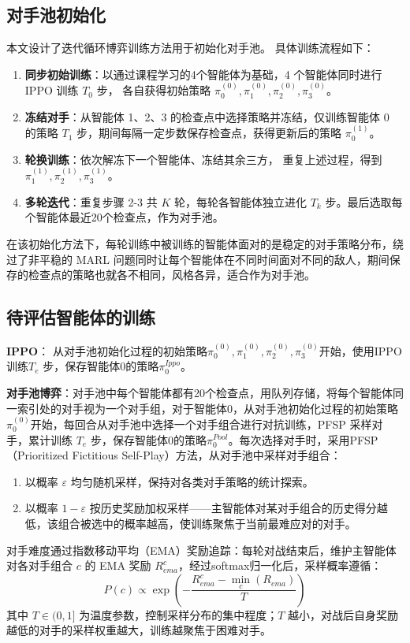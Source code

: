 \documentclass[12pt, a4paper, UTF8]{ctexart}
\numberwithin{equation}{section}
\begin{document}
\subsection{对手池初始化}
本文设计了迭代循环博弈训练方法用于初始化对手池。
具体训练流程如下：

\begin{enumerate}[label=第\arabic*轮：, leftmargin=*]
  \item \textbf{同步初始训练}：以通过课程学习的4个智能体为基础，4 个智能体同时进行 IPPO 训练 $T_0$ 步，
  各自获得初始策略 $\pi_0^{(0)}, \pi_1^{(0)}, \pi_2^{(0)}, \pi_3^{(0)}$。
  \item \textbf{冻结对手}：从智能体 1、2、3 的检查点中选择策略并冻结，仅训练智能体 0 的策略 $T_1$ 步，期间每隔一定步数保存检查点，获得更新后的策略 $\pi_0^{(1)}$。
  \item \textbf{轮换训练}：依次解冻下一个智能体、冻结其余三方，
  重复上述过程，得到 $\pi_1^{(1)}, \pi_2^{(1)}, \pi_3^{(1)}$。
  \item \textbf{多轮迭代}：重复步骤 2-3 共 $K$ 轮，每轮各智能体独立进化 $T_k$ 步。最后选取每个智能体最近20个检查点，作为对手池。
\end{enumerate}
在该初始化方法下，每轮训练中被训练的智能体面对的是稳定的对手策略分布，绕过了非平稳的 MARL 问题同时让每个智能体在不同时间面对不同的敌人，期间保存的检查点的策略也就各不相同，风格各异，适合作为对手池。

\subsection{待评估智能体的训练}
\textbf{IPPO}： 从对手池初始化过程的初始策略$\pi_0^{(0)}, \pi_1^{(0)}, \pi_2^{(0)}, \pi_3^{(0)}$开始，使用IPPO训练$T_e$ 步，保存智能体0的策略$\pi_0^{Ippo}$。

\textbf{对手池博弈}：对手池中每个智能体都有20个检查点，用队列存储，将每个智能体同一索引处的对手视为一个对手组，对于智能体0，从对手池初始化过程的初始策略$\pi_0^{(0)}$开始，每回合从对手池中选择一个对手组合进行对抗训练，PFSP 采样对手，累计训练 $T_e$ 步，保存智能体0的策略$\pi_0^{Pool}$。每次选择对手时，采用PFSP（Prioritized Fictitious Self-Play）方法，从对手池中采样对手组合：
\begin{enumerate}[label=(\arabic*)]
  \item 以概率 $\varepsilon$ 均匀随机采样，保持对各类对手策略的统计探索。
  \item 以概率 $1-\varepsilon$ 按历史奖励加权采样——主智能体对某对手组合的历史得分越低，该组合被选中的概率越高，使训练聚焦于当前最难应对的对手。
\end{enumerate}
对手难度通过指数移动平均（EMA）奖励追踪：每轮对战结束后，维护主智能体对各对手组合 $c$ 的 EMA 奖励 $R_{ema}^c$，经过softmax归一化后，采样概率遵循：
\begin{equation}
  P(c) \propto \exp\left(-\frac{R_{ema}^c - \min_c(R_{ema})}{T}\right)
  \label{eq:pfsp}
\end{equation}
其中 $T\in(0,1]$ 为温度参数，控制采样分布的集中程度；$T$ 越小，对战后自身奖励越低的对手的采样权重越大，训练越聚焦于困难对手。
\end{document}
